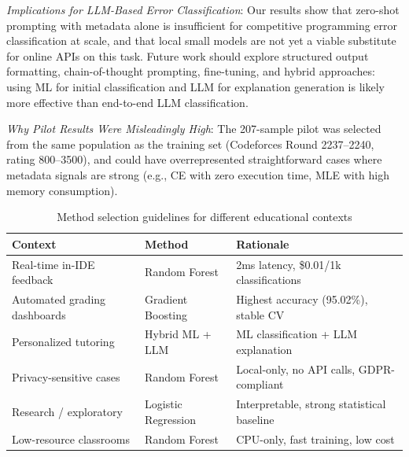 \documentclass[acmsmall]{acmart}
\begin{document}
\textit{Implications for LLM-Based Error Classification}: Our results show that
zero-shot prompting with metadata alone is insufficient for competitive
programming error classification at scale, and that local small models are not
yet a viable substitute for online APIs on this task. Future work should
explore structured output formatting, chain-of-thought prompting, fine-tuning,
and hybrid approaches: using ML for initial classification and LLM for
explanation generation is likely more effective than end-to-end LLM
classification.

\textit{Why Pilot Results Were Misleadingly High}: The 207-sample pilot was
selected from the same population as the training set (Codeforces Round
2237--2240, rating 800--3500), and could have overrepresented straightforward
cases where metadata signals are strong (e.g., CE with zero execution time,
MLE with high memory consumption).

\begin{table}[htbp]
\centering
\caption{LLM prediction analysis on full test set (n=2,672)}
\label{tab:llm-analysis}
%
\end{table}

\begin{table}[htbp]
\centering
\caption{Method selection guidelines for different educational contexts}
\label{tab:guidelines}
\begin{tabular}{>{\raggedright\arraybackslash}p{2.8cm}
 >{\raggedright\arraybackslash}p{2.8cm}
 >{\raggedright\arraybackslash}p{6.4cm}}
\toprule
\textbf{Context} & \textbf{Method} & \textbf{Rationale} \\
\midrule
Real-time in-IDE feedback & Random Forest & 2ms latency, \$0.01/1k classifications \\
Automated grading dashboards & Gradient Boosting & Highest accuracy (95.02\%), stable CV \\
Personalized tutoring & Hybrid ML + LLM & ML classification + LLM explanation \\
Privacy-sensitive cases & Random Forest & Local-only, no API calls, GDPR-compliant \\
Research / exploratory & Logistic Regression & Interpretable, strong statistical baseline \\
Low-resource classrooms & Random Forest & CPU-only, fast training, low cost \\
\bottomrule
\end{tabular}
\end{table}
\end{document}
